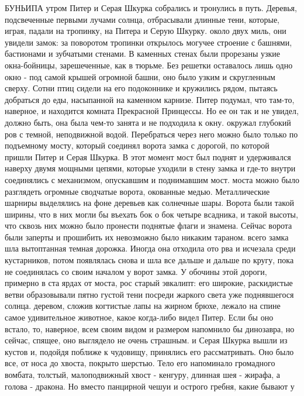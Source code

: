  БУНЬИПА
 утром Питер и Серая Шкурка собрались и тронулись в путь. 
Деревья, подсвеченные первыми лучами солнца, отбрасывали длинные тени, 
которые, играя, падали на тропинку, на Питера и Серую Шкурку.
 около двух миль, они увидели замок: за поворотом тропинки 
открылось могучее строение с башнями, бастионами и зубчатыми стенами. 
В каменных стенах были прорезаны узкие окна-бойницы, зарешеченные, как 
в тюрьме. Без решетки оставалось лишь одно окно - под самой крышей 
огромной башни, оно было узким и скругленным сверху. Сотни птиц сидели 
на его подоконнике и кружились рядом, пытаясь добраться до еды, 
насыпанной на каменном карнизе. Питер подумал, что там-то, наверное, и 
находится комната Прекрасной Принцессы. Но ее он так и не увидел, 
должно быть, она была чем-то занята и не подходила к окну.
 окружал глубокий ров с темной, неподвижной водой. 
Перебраться через него можно было только по подъемному мосту, который 
соединял ворота замка с дорогой, по которой пришли Питер и Серая 
Шкурка. В этот момент мост был поднят и удерживался наверху двумя 
мощными цепями, которые уходили в стену замка и где-то внутри 
соединялись с механизмом, опускавшим и поднимавшим мост.
 моста можно было разглядеть огромные сводчатые ворота, 
окованные медью. Металлические шарниры выделялись на фоне деревьев как 
солнечные шары. Ворота были такой ширины, что в них могли бы въехать 
бок о бок четыре всадника, и такой высоты, что сквозь них можно было 
пронести поднятые флаги и знамена. Сейчас ворота были заперты и 
прошибить их невозможно было никаким тараном.
 всего замка шла вытоптанная темная дорожка. Иногда она 
отходила ото рва и исчезала среди кустарников, потом появлялась снова 
и шла все дальше и дальше по кругу, пока не соединялась со своим 
началом у ворот замка. У обочины этой дороги, примерно в ста ярдах от 
моста, рос старый эвкалипт: его широкие, раскидистые ветви 
образовывали пятно густой тени посреди жаркого света уже поднявшегося 
солнца.
 деревом, сложив когтистые лапы на жирном брюхе, лежало на 
спине самое удивительное животное, какое когда-либо видел Питер. Если 
бы оно встало, то, наверное, всем своим видом и размером напомнило бы 
динозавра, но сейчас, спящее, оно выглядело не очень страшным.
 и Серая Шкурка вышли из кустов и, подойдя поближе к 
чудовищу, принялись его рассматривать. Оно было все, от носа до 
хвоста, покрыто шерстью. Тело его напоминало громадного вомбата, 
толстый, малоподвижный хвост - кенгуру, длинная шея - жирафа, а голова 
- дракона. Но вместо панцирной чешуи и острого гребня, какие бывают у 
